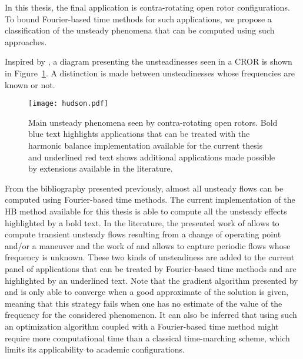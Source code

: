 
In this thesis, the final application is contra-rotating open rotor
configurations. To bound Fourier-based time methods for such
applications, we propose a classification of the
unsteady phenomena that can be computed using such approaches.

Inspired by \citet{Hodson1998},
a diagram presenting the unsteadinesses seen in 
a CROR is shown in Figure~\ref{fig:hudson}. A distinction
is made between unsteadinesses whose frequencies are
known or not.
\begin{figure}[htp]
  \centering
  \texttt{[image: hudson.pdf]}
  \caption{Main unsteady phenomena seen by contra-rotating
  open rotors. Bold blue text highlights applications that can
  be treated with the harmonic balance implementation available for the
  current thesis and underlined red text shows additional applications
  made possible by extensions available in the literature.}
  \label{fig:hudson}
\end{figure}
From the bibliography presented previously, almost all
unsteady flows can be computed using Fourier-based time methods.
The current implementation of the HB method available for
this thesis is able to compute all the unsteady effects highlighted
by a bold text. In the literature, the presented work of 
\citet{Mavriplis2012} allows to compute transient unsteady flows
resulting from a change of operating point and/or a maneuver and
the work of \citet{McMullen2002} and \citet{Gopinath2006} allows
to capture periodic flows whose frequency is unknown. These two
kinds of unsteadiness are added
to the current panel of applications that can
be treated by Fourier-based time methods and are
highlighted by an underlined text. Note
that the gradient algorithm presented by \citet{McMullen2002}
and \citet{Gopinath2006} is only able to converge when a 
good approximate of the solution is given, meaning
that this strategy fails when one has no estimate
of the value of the frequency for the considered phenomenon.
It can also be inferred that using such an optimization algorithm
coupled with a Fourier-based time method
might require more computational time than a classical time-marching scheme,
which limits its applicability to academic configurations.

